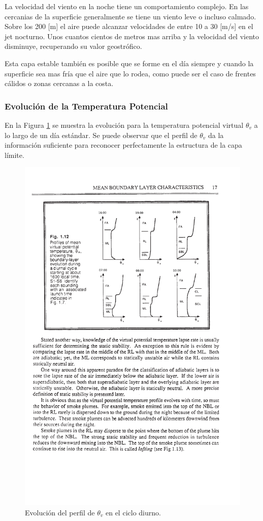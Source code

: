 La velocidad del viento en la noche tiene un comportamiento complejo. En las cercanias de la superficie generalmente se tiene un viento leve o incluso calmado. Sobre los 200 [m] el aire puede alcanzar velocidades de entre 10 a 30 [m/s] en el jet nocturno. Unos cuantos cientos de metros mas arriba y la velocidad del viento disminuye, recuperando su valor geostrófico.

Esta capa estable también es posible que se forme en el día siempre y cuando la superficie sea mas fría que el aire que lo rodea, como puede ser el caso de frentes cálidos o zonas cercanas a la costa.
\subsubsection{Evolución de la Temperatura Potencial}
En la Figura \ref{fig:03_pbl2} se muestra la evolución para la temperatura potencial virtual $\theta_v$ a lo largo de un día estándar. Se puede observar que el perfil de $\theta_v$ da la información suficiente para reconocer perfectamente la estructura de la capa límite. 
\begin{figure}[h!]
	\centering
	\includegraphics[width=0.7\linewidth,trim={5.6cm 14cm 2.7cm 3.3cm},clip]{Imagenes/03/pbl2}
	\caption{Evolución del perfil de $\theta_v$ en el ciclo diurno.}
	\label{fig:03_pbl2}
\end{figure}

